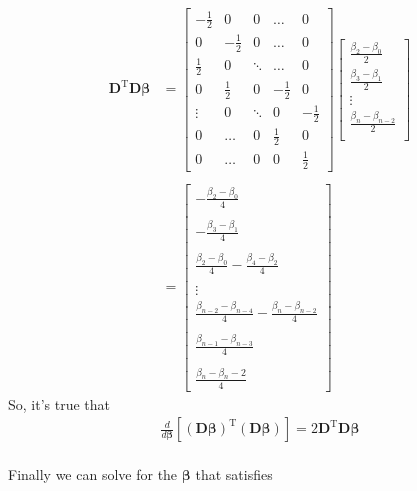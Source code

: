 \documentclass{article}
\newcommand{\B}{\boldsymbol\beta} %
\newcommand{\D}{\mathbf{D}}
\begin{document}
\begin{align*}
\D^{\textrm{T}}\D\B &= 
\begin{bmatrix}
  -\frac{1}{2} & 0  & 0 & \dots & 0\\
  0 & -\frac{1}{2} & 0  & \dots & 0 \\
  \frac{1}{2} & 0 & \ddots   & \dots & 0 \\
  0 & \frac{1}{2} & 0  & -\frac{1}{2}  & 0\\
  \vdots & 0 & \ddots & 0& -\frac{1}{2} \\
  0 & \dots & 0 & \frac{1}{2} & 0 \\
  0 & \dots & 0 & 0 & \frac{1}{2}
\end{bmatrix}
\begin{bmatrix}
\frac{\beta_2 - \beta_0}{2} \\
\frac{\beta_3 - \beta_1}{2} \\
\vdots \\
\frac{\beta_n - \beta_{n-2}}{2} \\
\end{bmatrix} \\ \\
&= 
\begin{bmatrix}
-\frac{\beta_2 - \beta_0}{4} \\\\
-\frac{\beta_3 - \beta_1}{4} \\\\
\frac{\beta_2 - \beta_0}{4} - \frac{\beta_4 - \beta_2}{4} \\\\
\vdots \\
\frac{\beta_{n-2} - \beta_{n-4}}{4} - \frac{\beta_n - \beta_{n-2}}{4}\\\\
\frac{\beta_{n-1} - \beta_{n-3}}{4} \\\\
\frac{\beta_n - \beta_n-2}{4}
\end{bmatrix}
\end{align*}
So, it's true that 
\begin{align*}
\frac{d}{d\B} \left[ (\D\B)^{\textrm{T}}(\D\B) \right] = 2\D^{\textrm{T}}\D\B\\
\end{align*}

Finally we can solve for the $\B$ that satisfies
\end{document}
